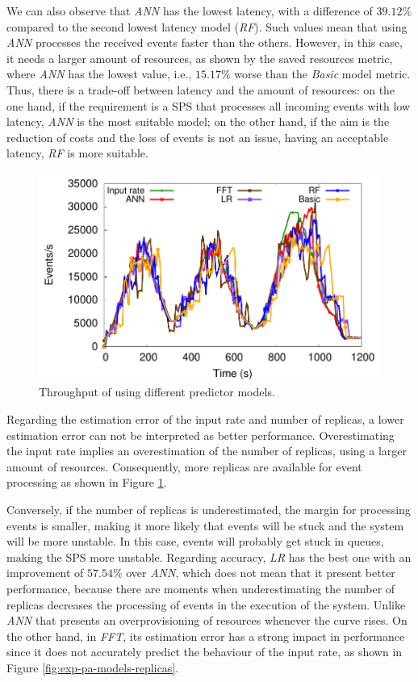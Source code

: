 We can also observe that \textit{ANN} has the lowest latency, with a difference of $39.12\%$ compared to the second lowest latency model (\textit{RF}). Such values mean that \pSPS{} using \textit{ANN} processes the received events faster than the others. However, in this case, it needs a larger amount of resources, as shown by the saved resources metric, where \textit{ANN} has the lowest value, i.e., $15.17\%$ worse than the \textit{Basic} model metric. Thus, there is a trade-off between latency and the amount of resources: on the one hand, if the requirement is a SPS that processes all incoming events with low latency, \textit{ANN} is the most suitable model; on the other hand, if the aim is the reduction of costs and the loss of events is not an issue, having an acceptable latency, \textit{RF} is more suitable.

\begin{figure}[!ht]
    \centering
    \includegraphics[width=0.75\linewidth]{figures/exp/predictive/TwitterLinear-Models-Throughput.pdf}
    \caption{Throughput of \pSPS{} using different predictor models.}
    \label{fig:exp-pa-models-throughput}
\end{figure}

Regarding the estimation error of the input rate and number of replicas, a lower estimation error can not be interpreted as better performance.
Overestimating the input rate implies an overestimation of the number of replicas, using a larger amount of resources. Consequently, more replicas are available for event processing as shown in Figure \ref{fig:exp-pa-models-throughput}.

Conversely, if the number of replicas is underestimated, the margin for processing events is smaller, making it more likely that events will be stuck and the system will be more unstable. 
In this case, events will probably get stuck in queues, making the SPS more unstable.
Regarding accuracy, \textit{LR} has the best one with an improvement of $57.54\%$ over \textit{ANN}, which does not mean that it present better performance, because there are moments when underestimating the number of replicas decreases the processing of events in the execution of the system. Unlike \textit{ANN} that presents an overprovisioning of resources whenever the curve rises. On the other hand, in \textit{FFT}, its estimation error has a strong impact in \pSPS{} performance since it does not accurately predict the behaviour of the input rate, as shown in Figure \ref{fig:exp-pa-models-replicas}.

